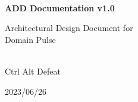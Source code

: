\begin{titlepage}
    \centering


    
    \vspace{2cm}
    \hrulefill\\
    \vspace{1cm}
    {\Huge\bfseries ADD Documentation v1.0}
    
    \vspace{1cm}
    
    {\Large Architectural Design Document for\\Domain Pulse}\\
    \vspace{1cm}
    \hrulefill\\
    
    \vfill
    
    {\large Ctrl Alt Defeat}
    
    \vspace{1cm}
    
    {\large 2023/06/26}\\
    
\end{titlepage}
  
